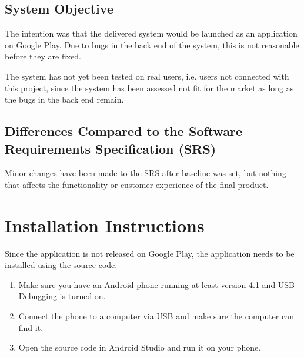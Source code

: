 \documentclass[a4paper]{article}
\begin{document}
\subsection{System Objective}
The intention was that the delivered system would be launched as an application on Google Play. Due to bugs in the back end of the system, this is not reasonable before they are fixed. 

The system has not yet been tested on real users, i.e. users not connected with this project, since the system has been assessed not fit for the market as long as the bugs in the back end remain.  

\subsection{Differences Compared to the Software Requirements Specification (SRS)}
Minor changes have been made to the SRS after baseline was set, but nothing that affects the functionality or customer experience of the final product.


\section{Installation Instructions}
Since the application is not released on Google Play, the application needs to be installed using the source code. 

\begin{enumerate}
\item Make sure you have an Android phone running at least version 4.1 and USB Debugging is turned on.
\item Connect the phone to a computer via USB and make sure the computer can find it.
\item Open the source code in Android Studio and run it on your phone.
\end{enumerate}
\end{document}
